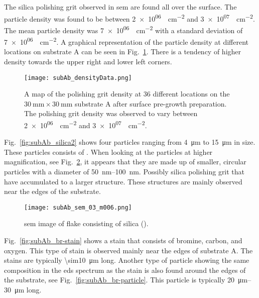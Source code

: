 The silica polishing grit observed in \ac{sem} are found all over the surface. The particle density was found to be between \SI{2e+06}{\particle\centi\metre^{-2}} and \SI{3e+07}{\particle\centi\metre^{-2}}. The mean particle density was \SI{7e+06}{\particle\centi\metre^{-2}} with a standard deviation of \SI{7e+06}{\particle\centi\metre^{-2}}. A graphical representation of the particle density at different locations on substrate A can be seen in Fig.~\ref{fig:subAb_densityData}. There is a tendency of higher density towards the upper right and lower left corners.

\begin{figure}[htbp]
    \centering
    \texttt{[image: subAb\_densityData.png]}
    \caption[Map of the polishing grit density on substrate A after surface pre-growth preparation.]{A map of the polishing grit density at 36 different locations on the $\SI{30}{\milli\metre}\times\SI{30}{\milli\metre}$ substrate A after surface pre-growth preparation. The polishing grit density was observed to vary between \SI{2e+06}{\particle\centi\metre^{-2}} and \SI{3e+07}{\particle\centi\metre^{-2}}.}
    \label{fig:subAb_densityData}
\end{figure}

Fig.~\ref{fig:subAb_silica2} shows four particles ranging from \SI{4}{\micro\metre} to \SI{15}{\micro\metre} in size. These particles consists of . When looking at the particles at higher magnification, see Fig.~\ref{fig:subAb_silica2_magnified}, it appears that they are made up of smaller, circular particles with a diameter of \SIrange{50}{100}{\nano\metre}. Possibly silica polishing grit that have accumulated to a larger structure. These structures are mainly observed near the edges of the substrate.

\begin{figure}
    \centering
    \texttt{[image: subAb\_sem\_03\_m006.png]}
    \caption[\Ac{sem} image of silica flake.]{\Acf{sem} image of flake consisting of silica ().}\label{fig:subAb_silica2_magnified}
\end{figure}

Fig.~\ref{fig:subAb_br-stain} shows a stain that consists of bromine, carbon, and oxygen. This type of stain is observed mainly near the edges of substrate A. The stains are typically \SI{\sim10}{\micro\metre} long. Another type of particle showing the same composition in the \ac{eds} spectrum as the stain is also found around the edges of the substrate, see Fig.~\ref{fig:subAb_br-particle}. This particle is typically \SIrange{20}{30}{\micro\metre} long.

